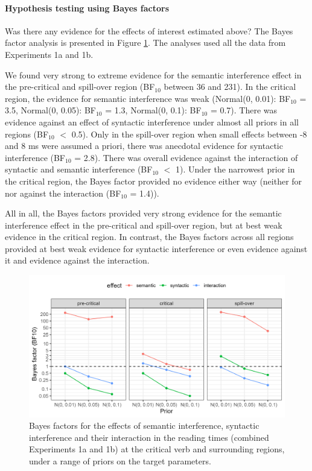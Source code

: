 \documentclass[review,preprint,12pt,authoryear,floatsintext]{elsarticle}
\begin{document}
\paragraph{Hypothesis testing using Bayes factors}

Was there any evidence for the effects of interest estimated above? The Bayes factor analysis is presented in Figure \ref{fig:spr_bfs}. The analyses used all the data from Experiments 1a and 1b. {We found very strong to extreme evidence for the semantic interference effect in the pre-critical and spill-over region (BF$_{10}$ between 36 and 231). In the critical region, the evidence for semantic interference was weak (Normal(0, 0.01): BF$_{10}$ = 3.5,
Normal(0, 0.05): BF$_{10}$ = 1.3,
Normal(0, 0.1): BF$_{10}$ = 0.7). There was evidence against an effect of syntactic interference under almost all priors in all regions (BF$_{10}$ $<$ 0.5). Only in the spill-over region when small effects between -8 and 8 ms were assumed a priori, there was anecdotal evidence for syntactic interference (BF$_{10}$ = 2.8). {There was overall evidence against the interaction of syntactic and semantic interference (BF$_{10}$ $<$ 1). Under the narrowest prior in the critical region, the Bayes factor provided no evidence either way (neither for nor against the interaction (BF$_{10}$ = 1.4)).}\label{insig_interaction}

All in all, the Bayes factors provided very strong evidence for the semantic interference effect in the pre-critical and spill-over region, but at best weak evidence in the critical region. In contrast, the Bayes factors  across all regions provided at best weak evidence for syntactic interference or even evidence against it and evidence against the interaction.}

\begin{figure}[ht]
    \caption{Bayes factors for the effects of semantic interference, syntactic interference and their interaction in the reading times (combined Experiments 1a and 1b) at the critical verb and surrounding regions, under a range of priors on the target parameters.}
    \label{fig:spr_bfs}
    \centering
    \includegraphics[width=\textwidth]{BF_plot_spr_774_allregions.png}
\end{figure}
\end{document}
